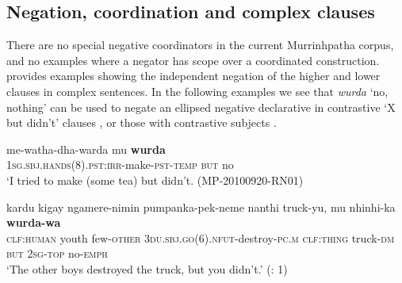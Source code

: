 \documentclass[output=paper,colorlinks,citecolor=brown]{langscibook}
\begin{document}
 
\subsection{Negation, coordination and complex clauses} \label{sec:mur:4.5}

There are no special negative coordinators in the current Murrinhpatha corpus, and no examples where a negator has scope over a coordinated construction.  provides examples showing the independent negation of the higher and lower clauses in complex sentences. In the following examples we see that \textit{wurda} ‘no, nothing’ can be used to negate an ellipsed negative declarative in contrastive ‘X but didn’t’ clauses , or those with contrastive subjects .

\ea\label{ex:mur:125}
    \gll me-watha-dha-warda mu \textbf{wurda}\\
         \textsc{1sg.sbj.hands(8).pst:irr-}make\textsc{{}-pst-temp} \textsc{but} no\\
    \glt ‘I tried to make (some tea) but didn’t. (MP-20100920-RN01)
\z

\ea\label{ex:mur:126}
    \gll kardu kigay ngamere-nimin pumpanka-pek-neme nanthi truck-yu, mu nhinhi-ka \textbf{wurda-wa}\\
         \textsc{clf:human} youth few-\textsc{other} \textsc{3du.sbj.go(6).nfut-}destroy\textsc{{}-pc.m} \textsc{clf:thing} truck-\textsc{dm} \textsc{but} \textsc{2sg-top} no\textsc{{}-emph}\\
    \glt ‘The other boys destroyed the truck, but you didn’t.’ (\citealt{FordMcCormack2011}: 1)
\z 
\end{document}

